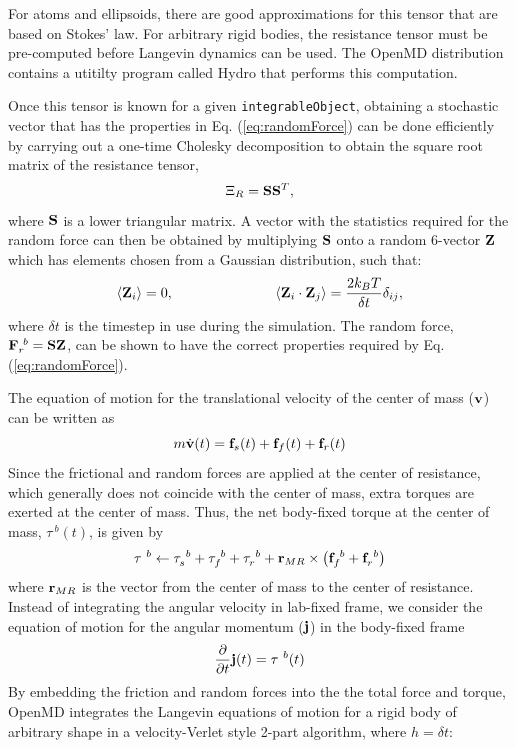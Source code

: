 \documentclass[]{book}
\begin{document}
For atoms and ellipsoids, there are good approximations for this
tensor that are based on Stokes' law.  For arbitrary rigid bodies, the
resistance tensor must be pre-computed before Langevin dynamics can be
used.  The {\sc OpenMD} distribution contains a utitilty program called
Hydro that performs this computation.

Once this tensor is known for a given {\tt integrableObject},
obtaining a stochastic vector that has the properties in
Eq. (\ref{eq:randomForce}) can be done efficiently by carrying out a
one-time Cholesky decomposition to obtain the square root matrix of
the resistance tensor,
\begin{equation} 
\Xi_R = {\bf S} {\bf S}^{T},
\label{eq:Cholesky}
\end{equation} 
where ${\bf S}$ is a lower triangular matrix.\cite{Schlick2002} A
vector with the statistics required for the random force can then be
obtained by multiplying ${\bf S}$ onto a random 6-vector ${\bf Z}$ which
has elements chosen from a Gaussian distribution, such that:
\begin{equation}
\langle {\bf Z}_i \rangle = 0, \hspace{1in} \langle {\bf Z}_i \cdot
{\bf Z}_j \rangle = \frac{2 k_B T}{\delta t} \delta_{ij},
\end{equation}
where $\delta t$ is the timestep in use during the simulation. The
random force, ${\bf F}_{r}^{~b} = {\bf S} {\bf Z}$, can be shown to have the
correct properties required by Eq. (\ref{eq:randomForce}).

The equation of motion for the translational velocity of the center of
mass (${\bf v}$) can be written as
\begin{equation}
m \dot{{\bf v}} (t) =  {\bf f}_{s}(t) + {\bf f}_{f}(t) +
{\bf f}_{r}(t)
\end{equation}
Since the frictional and random forces are applied at the center of
resistance, which generally does not coincide with the center of mass,
extra torques are exerted at the center of mass. Thus, the net
body-fixed torque at the center of mass, $\tau^{~b}(t)$,
is given by
\begin{equation}
\tau^{~b} \leftarrow \tau_{s}^{~b} + \tau_{f}^{~b} + \tau_{r}^{~b} + {\bf r}_{MR} \times \left( {\bf f}_{f}^{~b} + {\bf f}_{r}^{~b} \right)
\end{equation}
where ${\bf r}_{MR}$ is the vector from the center of mass to the center of
resistance. Instead of integrating the angular velocity in lab-fixed
frame, we consider the equation of motion for the angular momentum
(${\bf j}$) in the body-fixed frame
\begin{equation}
\frac{\partial}{\partial t}{\bf j}(t) = \tau^{~b}(t)
\end{equation}
By embedding the friction and random forces into the the total force
and torque, {\sc OpenMD} integrates the Langevin equations of motion
for a rigid body of arbitrary shape in a velocity-Verlet style 2-part
algorithm, where $h = \delta t$:
\end{document}
